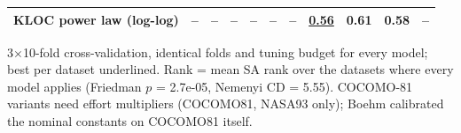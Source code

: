 \begin{table}[t]
\begin{tabular}{lrrrrrrrrrr}
KLOC power law (log-log) & -- & -- & -- & -- & -- & -- & \underline{0.56} & 0.61 & 0.58 & -- \\
\bottomrule
\end{tabular}
\par\smallskip\parbox{0.95\linewidth}{\footnotesize 3$\times$10-fold cross-validation, identical folds and tuning budget for every model; best per dataset underlined. Rank = mean SA rank over the datasets where every model applies (Friedman $p$ = 2.7e-05, Nemenyi CD = 5.55). COCOMO-81 variants need effort multipliers (COCOMO81, NASA93 only); Boehm calibrated the nominal constants on COCOMO81 itself.}
\end{table}
